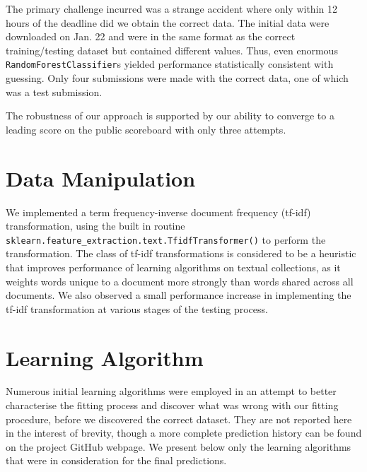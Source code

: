 \documentclass[10pt]{article}
\begin{document}
The primary challenge incurred was a strange accident where only within 12 hours of the deadline did we obtain the correct data. The initial data were downloaded on Jan. 22 and were in the same format as the correct training/testing dataset but contained different values. Thus, even enormous \texttt{RandomForestClassifier}s yielded performance statistically consistent with guessing. Only four submissions were made with the correct data, one of which was a test submission.

The robustness of our approach is supported by our ability to converge to a leading score on the public scoreboard with only three attempts.

\section{Data Manipulation}

We implemented a term frequency-inverse document frequency (tf-idf) transformation, using the built in routine \texttt{sklearn.feature\_extraction.text.TfidfTransformer()} to perform the transformation. The class of tf-idf transformations is considered to be a heuristic that improves performance of learning algorithms on textual collections, as it weights words unique to a document more strongly than words shared across all documents. We also observed a small performance increase in implementing the tf-idf transformation at various stages of the testing process.

\section{Learning Algorithm}

Numerous initial learning algorithms were employed in an attempt to better characterise the fitting process and discover what was wrong with our fitting procedure, before we discovered the correct dataset. They are not reported here in the interest of brevity, though a more complete prediction history can be found on the project GitHub webpage. We present below only the learning algorithms that were in consideration for the final predictions.
\end{document}
